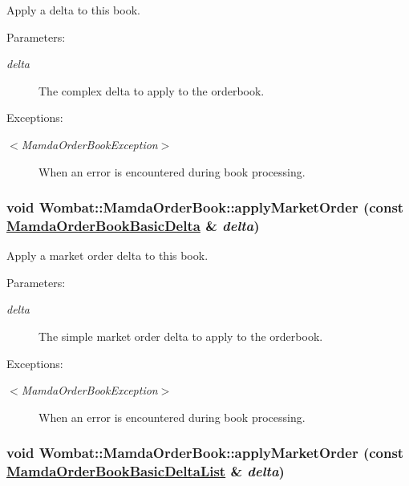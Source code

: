 Apply a delta to this book. 

\begin{Desc}
\item[Parameters:]
\begin{description}
\item[{\em delta}]The complex delta to apply to the orderbook.\end{description}
\end{Desc}
\begin{Desc}
\item[Exceptions:]
\begin{description}
\item[{\em $<$Mamda\-Order\-Book\-Exception$>$}]When an error is encountered during book processing. \end{description}
\end{Desc}
\hypertarget{classWombat_1_1MamdaOrderBook_da9a33dbc3e2cc7f6ac8ad5da9495d04}{
\subsubsection[applyMarketOrder]{\setlength{\rightskip}{0pt plus 5cm}void Wombat::Mamda\-Order\-Book::apply\-Market\-Order (const \hyperlink{classWombat_1_1MamdaOrderBookBasicDelta}{Mamda\-Order\-Book\-Basic\-Delta} \& {\em delta})}}
\label{classWombat_1_1MamdaOrderBook_da9a33dbc3e2cc7f6ac8ad5da9495d04}


Apply a market order delta to this book. 

\begin{Desc}
\item[Parameters:]
\begin{description}
\item[{\em delta}]The simple market order delta to apply to the orderbook.\end{description}
\end{Desc}
\begin{Desc}
\item[Exceptions:]
\begin{description}
\item[{\em $<$Mamda\-Order\-Book\-Exception$>$}]When an error is encountered during book processing. \end{description}
\end{Desc}
\hypertarget{classWombat_1_1MamdaOrderBook_a6274446bf3f77dc34eacea2c5876a18}{
\subsubsection[applyMarketOrder]{\setlength{\rightskip}{0pt plus 5cm}void Wombat::Mamda\-Order\-Book::apply\-Market\-Order (const \hyperlink{classWombat_1_1MamdaOrderBookBasicDeltaList}{Mamda\-Order\-Book\-Basic\-Delta\-List} \& {\em delta})}}
\label{classWombat_1_1MamdaOrderBook_a6274446bf3f77dc34eacea2c5876a18}


